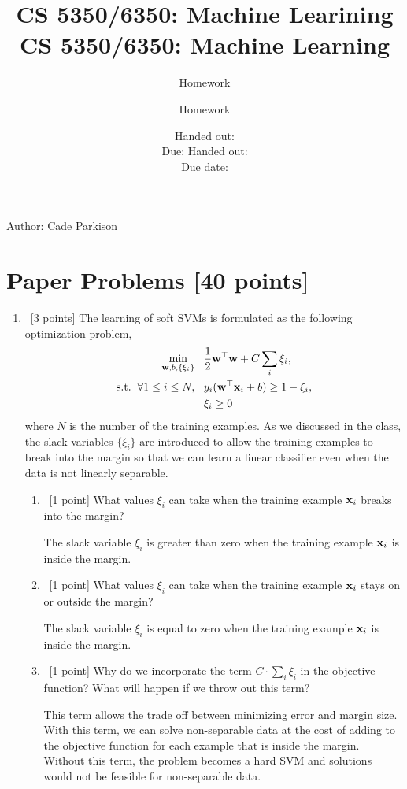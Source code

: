 \documentclass[12pt, fullpage,letterpaper]{article}
\title{CS 5350/6350: Machine Learining \semester}
\author{Homework \assignmentId}
\date{Handed out: \releaseDate\\
	Due: \dueDate}
\title{CS 5350/6350: Machine Learning \semester}
\author{Homework \assignmentId}
\date{Handed out: \releaseDate\\
  Due date: \dueDate}
\begin{document}
\maketitle


\newcommand{\Hcal}{\mathcal{H}} 
{\footnotesize
	Author: Cade Parkison
		

}


\section{Paper Problems [40 points]}
\begin{enumerate}
	\item~[3 points] The learning of soft SVMs is formulated as the following optimization problem,
		\begin{align}
		\min\limits_{{\bf w}, b, \{\xi_i\}} &\;\;\;\frac{1}{2}{\bf w}^\top{\bf w} + C\sum_i \xi_i, \nonumber\\
		\mathrm{s.t.}\;\; \forall 1 \le i \le N,&\;\;\; y_i({\bf w}^\top {\bf x}_i + b) \ge 1 - \xi_i , \nonumber \\
		&\;\;\; \xi_i \ge 0 \nonumber
		\end{align}
		where $N$ is the number of the training examples.
	As we discussed in the class, the slack variables $\{\xi_i\}$ are introduced to allow the training examples to break into the margin so that we can learn a linear classifier even when the data is not linearly separable. 
	\begin{enumerate}
		\item~[1 point] What values $\xi_i$ can take when the training example ${\bf x}_i$ breaks into the margin? 
		
		
		The slack variable $\xi_i$ is greater than zero when the training example ${\bf x}_i$ is inside the margin.
		
		
		\item~[1 point] What values $\xi_i$ can take when the training example ${\bf x}_i$ stays on or outside the margin? 
		
		
		The slack variable $\xi_i$ is equal to zero when the training example ${\bf x}_i$ is inside the margin.
		
		
		\item~[1 point] Why do we incorporate the term $C\cdot\sum_i \xi_i $ in the objective function? What will happen if we throw out this term?

		This term allows the trade off between minimizing error and margin size. With this term, we can solve non-separable data at the cost of adding to the objective function for each example that is inside the margin. Without this term, the problem becomes a hard SVM and solutions would not be feasible for non-separable data. 
		

\end{enumerate}
\end{enumerate}
\end{document}
